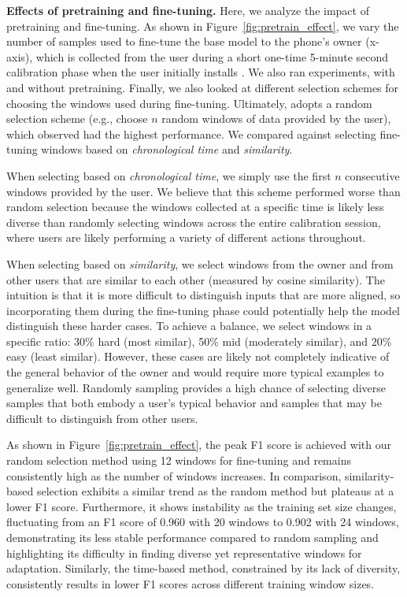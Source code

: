     \noindent\textbf{Effects of pretraining and fine-tuning.} Here, we analyze the impact of pretraining and fine-tuning. As shown in Figure~\ref{fig:pretrain_effect}, we vary the number of samples used to fine-tune the base model to the phone's owner (x-axis), which is collected from the user during a short one-time 5-minute second calibration phase when the user initially installs \sys. We also ran experiments, with and without pretraining. Finally, we also looked at different selection schemes for choosing the windows used during fine-tuning. Ultimately, \sys adopts a random selection scheme (e.g., choose $n$ random windows of data provided by the user), which observed had the highest performance. We compared against selecting fine-tuning windows based on \textit{chronological time} and \textit{similarity}. 
    
    When selecting based on \textit{chronological time}, we simply use the first $n$ consecutive windows provided by the user. We believe that this scheme performed worse than random selection because the windows collected at a specific time is likely less diverse than randomly selecting windows across the entire calibration session, where users are likely performing a variety of different actions throughout.
    
    When selecting based on \textit{similarity}, we select windows from the owner and from other users that are similar to each other (measured by cosine similarity). The intuition is that it is more difficult to distinguish inputs that are more aligned, so incorporating them during the fine-tuning phase could potentially help the model distinguish these harder cases. To achieve a balance, we select windows in a specific ratio: 30\% hard (most similar), 50\% mid (moderately similar), and 20\% easy (least similar). However, these cases are likely not completely indicative of the general behavior of the owner and would require more typical examples to generalize well. Randomly sampling provides a high chance of selecting diverse samples that both embody a user's typical behavior and samples that may be difficult to distinguish from other users.

    As shown in Figure~\ref{fig:pretrain_effect}, the peak F1 score is achieved with our random selection method using 12 windows for fine-tuning and remains consistently high as the number of windows increases. In comparison, similarity-based selection exhibits a similar trend as the random method but plateaus at a lower F1 score. Furthermore, it shows instability as the training set size changes, fluctuating from an F1 score of 0.960 with 20 windows to 0.902 with 24 windows, demonstrating its less stable performance compared to random sampling and highlighting its difficulty in finding diverse yet representative windows for adaptation. Similarly, the time-based method, constrained by its lack of diversity, consistently results in lower F1 scores across different training window sizes.


